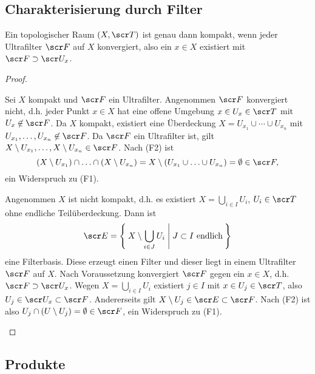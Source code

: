\subsection{Charakterisierung durch Filter}

\begin{st}
	Ein topologischer Raum $(X, \scr T)$ ist genau dann kompakt, wenn jeder Ultrafilter $\scr F$ auf $X$ konvergiert, also ein $x \in X$ existiert mit $\scr F \supset \scr U_x$.
	\begin{proof}
		\begin{segnb}[„$\implies$“]
			Sei $X$ kompakt und $\scr F$ ein Ultrafilter.
			Angenommen $\scr F$ konvergiert nicht, d.h. jeder Punkt $x \in X$ hat eine offene Umgebung $x \in U_x \in \scr T$ mit $U_x \not\in \scr F$.
			Da $X$ kompakt, existiert eine Überdeckung $X = U_{x_1} \cup \dotsb \cup U_{x_n}$ mit $U_{x_1}, \dotsc, U_{x_n} \not\in \scr F$.
			Da $\scr F$ ein Ultrafilter ist, gilt $X \setminus U_{x_1}, \dotsc, X \setminus U_{x_n} \in \scr F$.
			Nach (F2) ist
			\[
				(X \setminus U_{x_1}) \cap \dotsc \cap (X \setminus U_{x_n})
				= X \setminus (U_{x_1} \cup \dotsc \cup U_{x_n})
				= \emptyset \in \scr F,
			\]
			ein Widerspruch zu (F1).
		\end{segnb}
		\begin{segnb}[„$\impliedby$“]
			Angenommen $X$ ist nicht kompakt, d.h. es existiert $X = \bigcup_{i\in I} U_i$, $U_i \in \scr T$ ohne endliche Teilüberdeckung.
			Dann ist
			\[
				\scr E
				= \Set{ X \setminus \bigcup_{i\in J} U_i | J \subset I \text{ endlich} }
			\]
			eine Filterbasis.
			Diese erzeugt einen Filter und dieser liegt in einem Ultrafilter $\scr F$ auf $X$.
			Nach Voraussetzung konvergiert $\scr F$ gegen ein $x \in X$, d.h. $\scr F \supset \scr U_x$.
			Wegen $X = \bigcup_{i\in I} U_i$ existiert $j \in I$ mit $x \in U_j \in \scr T$, also $U_j \in \scr U_x \subset \scr F$.
			Andererseits gilt $X \setminus U_j \in \scr E \subset \scr F$.
			Nach (F2) ist also $U_j \cap (U \setminus U_j) = \emptyset \in \scr F$, ein Widerspruch zu (F1).
		\end{segnb}
	\end{proof}
\end{st}

\subsection{Produkte}

